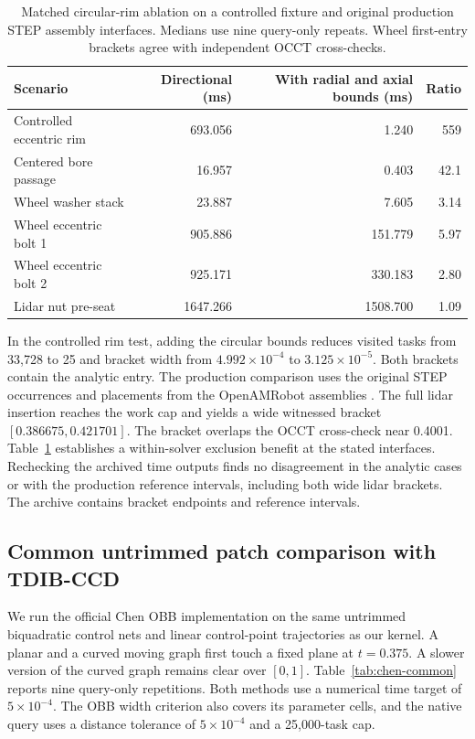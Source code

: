 \begin{table}[!htbp]
\centering\small
\caption{Matched circular-rim ablation on a controlled fixture and original
production STEP assembly interfaces. Medians use nine query-only repeats.
Wheel first-entry brackets agree with independent OCCT cross-checks.}
\label{tab:rim-ablation}
\begin{tabular}{lrrr}
\toprule
Scenario & Directional (ms) & With radial and axial bounds (ms) & Ratio\\
\midrule
Controlled eccentric rim & 693.056 & 1.240 & 559\\
Centered bore passage & 16.957 & 0.403 & 42.1\\
Wheel washer stack & 23.887 & 7.605 & 3.14\\
Wheel eccentric bolt 1 & 905.886 & 151.779 & 5.97\\
Wheel eccentric bolt 2 & 925.171 & 330.183 & 2.80\\
Lidar nut pre-seat & 1647.266 & 1508.700 & 1.09\\
\bottomrule
\end{tabular}
\end{table}

In the controlled rim test, adding the circular bounds reduces visited
tasks from 33,728 to 25 and bracket width from \(4.992\times10^{-4}\)
to \(3.125\times10^{-5}\). Both brackets contain the analytic entry.
The production comparison uses the original STEP occurrences and placements
from the OpenAMRobot assemblies \cite{openamrobot}. The full lidar
insertion reaches the work cap and yields a wide witnessed bracket
\([0.386675,0.421701]\). The bracket overlaps the OCCT cross-check near
0.4001. Table~\ref{tab:rim-ablation} establishes a within-solver
exclusion benefit at the stated interfaces. Rechecking the archived
time outputs finds no disagreement in the analytic cases or with the
production reference intervals, including both wide lidar brackets.
The archive contains bracket endpoints and reference intervals.

\subsection{Common untrimmed patch comparison with TDIB-CCD}

We run the official Chen OBB implementation on the same untrimmed
biquadratic control nets and linear control-point trajectories as
our kernel. A planar and a curved moving graph first touch a fixed
plane at \(t=0.375\). A slower version of the curved graph remains
clear over \([0,1]\). Table~\ref{tab:chen-common} reports nine query-only
repetitions. Both methods use a numerical time target of
\(5\times10^{-4}\). The OBB width criterion also covers its parameter
cells, and the native query uses a distance tolerance of \(5\times10^{-4}\)
and a 25,000-task cap.


